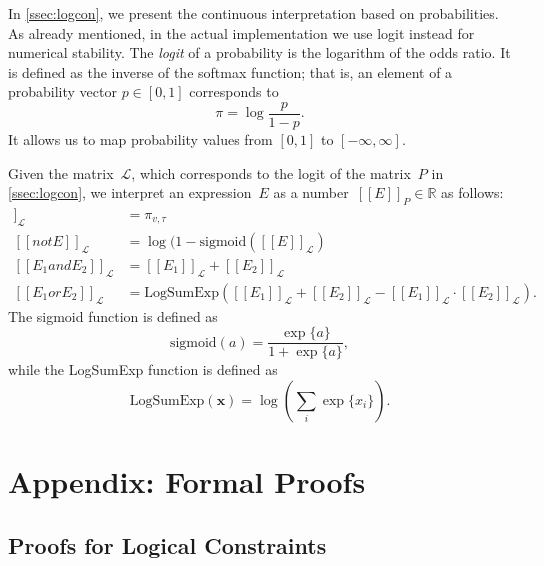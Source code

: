 \documentclass[acmsmall, review, anonymous]{acmart}\settopmatter{printfolios=true,printccs=false,printacmref=false}
\newcommand{\qqpi}[2]{[\![#2]\!]_{#1}}
\newcommand{\margincomment}[2]{\marginpar{\scriptsize\color{Maroon}#1 says: #2}}
\newcommand{\ivp}[1]{\margincomment{IVP}{#1}}
\begin{document}
In \cref{ssec:logcon}, we present the continuous interpretation based on probabilities.
As already mentioned, in the actual implementation we use logit instead for numerical stability.
The \emph{logit} of a probability is the logarithm of the odds ratio.
It is defined as the inverse of the softmax function; that is, an element of a probability vector $p \in [0,1]$ corresponds to
\begin{equation*}
	\pi = \log \frac{p}{1 - p}.
\end{equation*}
It allows us to map probability values from $\left[ 0, 1 \right]$ to $\left[ -\infty, \infty \right]$.

Given the matrix~$\mathcal{L}$, which corresponds to the logit of the matrix~$P$ in \cref{ssec:logcon}, we interpret an expression~$E$ as a number~$\qqpi{P}{E} \in \mathbb{R}$ as  follows:
\begin{align*}
	\qqpi{\mathcal{L}}{x_v \mathrel{is} l_\tau} & = \pi_{v,\tau}                                                \\ \label{eq:logits}
	\qqpi{\mathcal{L}}{\mathrel{not} E}         & = \log(1-\text{sigmoid}(\qqpi{\mathcal{L}}{E})                \\
	\qqpi{\mathcal{L}}{E_1 \mathrel{and} E_2}   & = \qqpi{\mathcal{L}}{E_1} \mathrel{+} \qqpi{\mathcal{L}}{E_2} \\
	\qqpi{\mathcal{L}}{E_1 \mathrel{or} E_2}    & = \text{LogSumExp}(
	\qqpi{\mathcal{L}}{E_1} + \qqpi{\mathcal{L}}{E_2} - \qqpi{\mathcal{L}}{E_1} \cdot \qqpi{\mathcal{L}}{E_2}).
\end{align*}
The sigmoid function is defined as
\begin{equation*}
	\text{sigmoid}(a) = \frac{\exp\{a\}}{1 + \exp\{a\}},
\end{equation*}
while the LogSumExp function is defined as
\begin{equation*}
	\text{LogSumExp}(\bm{x}) = \log\left( \sum_i \exp\{x_i\} \right).
\end{equation*}

\section{Appendix: Formal Proofs}\label{app:proofs}
\subsection{Proofs for Logical Constraints}
\end{document}
